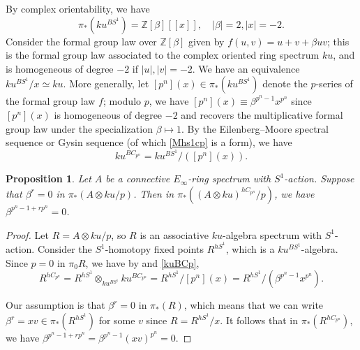 \documentclass{amsart}
\newtheorem{proposition}[theorem]{Proposition}
\theoremstyle{definition}
\begin{document}
By complex orientability, we have
\[ \pi_*( ku^{BS^1}) = \mathbb{Z}[\beta][[x]], \quad |\beta| = 2, |x|  = -2
.\]
Consider the formal group law
over $\mathbb{Z}[\beta]$ given by $f(u,v) = u + v + \beta uv$; this is the
formal group law associated to the complex oriented ring spectrum $ku$, and is
homogeneous of degree $-2$ if $|u|, |v| = -2$. 
We have an equivalence
$ku^{BS^1}/x \simeq ku$. 
More generally, let $[p^n](x) \in \pi_* ( ku^{BS^1})$ denote the $p$-series of the formal group
law $f$; modulo $p$, we have 
$[p^n](x) \equiv \beta^{p^n-1} x^{p^n}$ since $[p^n] (x)$ is homogeneous of
degree $-2$ and recovers the multiplicative formal group law under the
specialization $\beta \mapsto 1$. 
By the Eilenberg--Moore spectral sequence or Gysin sequence (of which
\eqref{Mhs1cp} is a form), we have
\begin{equation} \label{kuBCp} ku^{BC_{p^n}} = ku^{BS^1}/
([p^n](x)).\end{equation}

\begin{proposition} 
\label{easybetabound}
Let 
$A$ be a connective $E_\infty$-ring spectrum with $S^1$-action. 
Suppose that $\beta^r = 0$ in $\pi_*(A \otimes ku/p)$. 
Then in $\pi_*((A \otimes ku)^{hC_{p^n}}/p)$, we have $\beta^{p^{n} -1 + rp^n} =
0$. 
\end{proposition} 
\begin{proof} 
Let $R = A \otimes ku/p$, so $R$ is an associative $ku$-algebra spectrum with
$S^1$-action. 
Consider the $S^1$-homotopy fixed points $R^{hS^1}$, which is a
$ku^{BS^1}$-algebra. 
Since $p = 0$ in $\pi_0 R$, 
we have
by  and \eqref{kuBCp},
\[ R^{hC_{p^n}} = R^{hS^1} \otimes_{ku^{BS^1}} ku^{BC_{p^n}} = 
R^{hS^1}/ [p^n](x) = R^{hS^1}/ (\beta^{p^n-1}x^{p^n}).\]

Our assumption is that $\beta^r =0$ in $\pi_*(R)$, which means that we can write
$\beta^r = x v \in \pi_*(R^{hS^1})$ for some $v$ since $R = R^{hS^1}/x$. 
It follows that in $\pi_*(R^{hC_{p^n}})$, we have
$\beta^{p^n -1 + rp^n} = 
\beta^{p^n-1} (xv)^{p^n} = 0$. 
\end{proof} 
\end{document}

